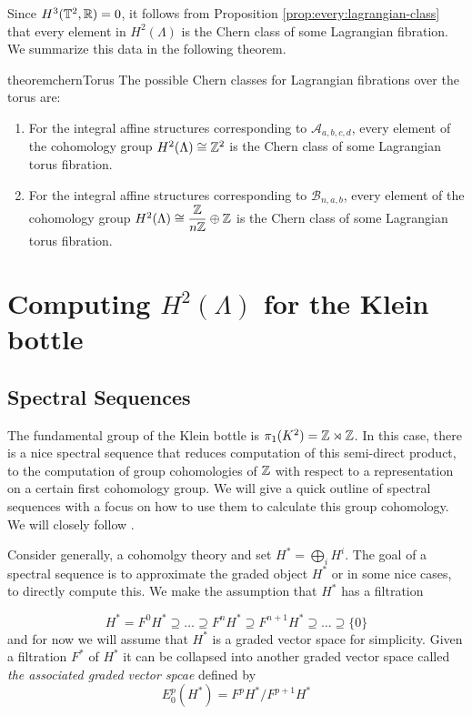 Since $H^3(\mathbb{T}^2, \mathbb{R}) = 0$, it follows from Proposition
\ref{prop:every:lagrangian-class} that every element in $H^2(\Lambda)$ is the
Chern class of some Lagrangian fibration. We summarize this data in the
following theorem.

\begin{restatable}{theorem}{chernTorus}
    The possible Chern classes for Lagrangian fibrations over the torus are:
    \begin{enumerate}
        \item For the integral affine structures corresponding to $\mathcal{A}_{a,b,c,d}$,
              every element of the cohomology group $H^2(\Lambda) \cong \mathbb{Z}^2$ is the Chern
              class of some Lagrangian torus fibration.
        \item For the integral affine structures corresponding to $\mathcal{B}_{n,a,b}$,
              every element of the cohomology group $H^2(\Lambda) \cong \dfrac{\mathbb{Z}}{n \mathbb{Z}}
                  \oplus \mathbb{Z}$ is the Chern class of some Lagrangian torus fibration.
    \end{enumerate}
\end{restatable}

\section{Computing $H^2(\Lambda)$ for the Klein bottle}
\subsection{Spectral Sequences}\label{sec:spectral-seq}
The fundamental group of the Klein bottle is $\pi_1(K^2) = \mathbb{Z} \rtimes \mathbb{Z}$. In
this case, there is a nice spectral sequence that reduces computation of this
semi-direct product, to the computation of group cohomologies of $\mathbb{Z}$ with
respect to a representation on a certain first cohomology group. We will give a
quick outline of spectral sequences with a focus on how to use them to
calculate this group cohomology. We will closely follow \cite{McCleary2001}.

Consider generally, a cohomolgy theory and set $H^* = \bigoplus_i H^i$. The
goal of a spectral sequence is to approximate the graded object $H^*$ or in
some nice cases, to directly compute this. We make the assumption that $H^*$
has a filtration

$$
    H^*=F^0H^* \supseteq \dots \supseteq F^nH^* \supseteq F^{n+1}H^* \supseteq \dots \supseteq \{0\}
$$
and for now we will assume that $H^*$ is a graded vector space for simplicity. Given a filtration $F^*$ of $H^*$ it
can be collapsed into another graded vector space called \emph{the associated graded vector spcae} defined by
$$
    E_0^p(H^*) = F^pH^*/F^{p+1}H^*
$$

